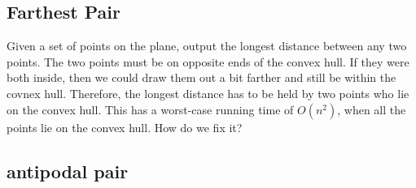 \documentclass[portrait,10pt, a4paper]{article}
\begin{document}
\begin{multicols*}{3}
	\subsection{Farthest Pair}
		Given a set of points on the plane, output the longest distance between any two points. The two points
		must be on opposite ends of the convex hull. If they were both inside, then we could draw them out a bit
		farther and still be within the covnex hull. Therefore, the longest distance has to be held by two 
		points who lie on the convex hull. This has a worst-case running time of $O(n^{2})$, when all the points
		lie on the convex hull. How do we fix it?
	\subsection{antipodal pair}

\end{multicols*}
\end{document}

